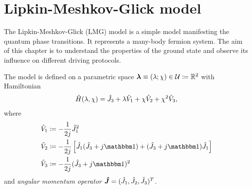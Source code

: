 \chapter{Lipkin-Meshkov-Glick model}
\label{chap:lipkin}

The Lipkin-Meshkov-Glick (LMG) model is a simple model manifesting the quantum phase transitions. It represents a many-body fermion system. The aim of this chapter is to understand the properties of the ground state and observe its influence on different driving protocols.


The model is defined on a parametric space ${\bm\lambda}\equiv (\lambda;\chi)\in\mathcal U\coloneqq \mathbb{R}^2$ with Hamiltonian
\begin{equation}
    \hat{H}(\lambda,\chi)=\hat{J}_3+\lambda\hat V_1 +\chi \hat V_2+\chi^2 \hat V_3,
    \label{eq:firstOrderTransitionHamiltonian}
\end{equation}
where
\begin{align}
    \hat V_1 &\coloneqq-\frac{1}{2j}\J_1^2\\
    \hat V_2 &\coloneqq -\frac{1}{2j}\left[\J_1(\J_3+j\Id)+(\J_3+j\Id)\J_1\right]\\
    \hat V_3 &\coloneqq -\frac{1}{2j}(\J_3+j\Id)^2
\end{align}
and \emph{angular momentum operator} $\bm{\hat{J}}=(\hat{J}_1,\hat{J}_2,\hat{J}_3)^T$.

